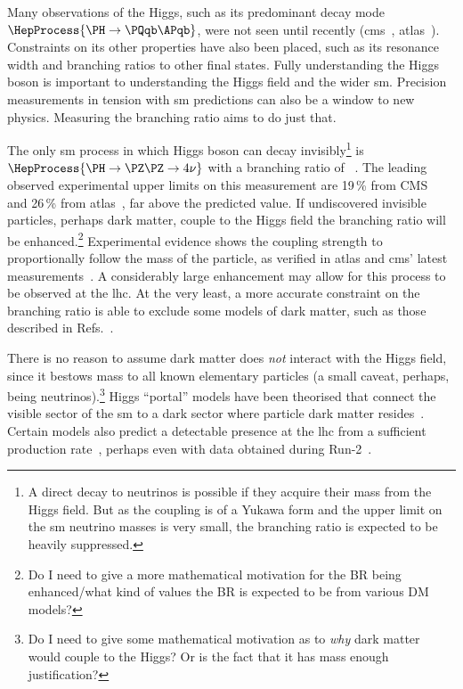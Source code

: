 Many observations of the Higgs, such as its predominant decay mode $\HepProcess{\PH \to \Pqb\APqb}$, were not seen until recently (\acrshort{cms}~\cite{Sirunyan:2018kst}, \acrshort{atlas}~\cite{Aaboud:2018zhk}). Constraints on its other properties have also been placed, such as its resonance width and branching ratios \BR to other final states. Fully understanding the Higgs boson is important to understanding the Higgs field and the wider \acrlong{sm}. Precision measurements in tension with \acrshort{sm} predictions can also be a window to new physics. Measuring the \higgstoinv branching ratio aims to do just that.

The only \acrshort{sm} process in which Higgs boson can decay invisibly\footnote{A direct decay to neutrinos is possible if they acquire their mass from the Higgs field. But as the coupling is of a Yukawa form and the upper limit on the \acrshort{sm} neutrino masses is very small, the branching ratio is expected to be heavily suppressed.} is $\HepProcess{\PH \to \PZ\PZ \to 4\nu}$ with a branching ratio of ~\cite{Heinemeyer:1559921}. The leading observed experimental upper limits on this measurement are 19\,\% from CMS~\cite{Sirunyan:2018owy} and 26\,\% from \acrshort{atlas}~\cite{Aaboud:2019rtt}, far above the predicted value. If undiscovered invisible particles, perhaps dark matter, couple to the Higgs field the branching ratio will be enhanced.\footnote{Do I need to give a more mathematical motivation for the BR being enhanced/what kind of values the BR is expected to be from various DM models?} Experimental evidence shows the coupling strength to proportionally follow the mass of the particle, as verified in \acrshort{atlas} and \acrshort{cms}' latest measurements~\cite{Sopczak:2708121}. A considerably large enhancement may allow for this process to be observed at the \acrshort{lhc}. At the very least, a more accurate constraint on the branching ratio is able to exclude some models of dark matter, such as those described in Refs.~.

There is no reason to assume dark matter does \emph{not} interact with the Higgs field, since it bestows mass to all known elementary particles (a small caveat, perhaps, being neutrinos).\footnote{Do I need to give some mathematical motivation as to \emph{why} dark matter would couple to the Higgs? Or is the fact that it has mass enough justification?} Higgs ``portal'' models have been theorised that connect the visible sector of the \acrlong{sm} to a dark sector where particle dark matter resides~\cite{higgs_portal_singlet_dm,Arcadi:2019lka}. Certain models also predict a detectable presence at the \acrshort{lhc} from a sufficient production rate~\cite{Boveia:2018yeb}, perhaps even with data obtained during Run-2~\cite{Abercrombie:2015wmb}.

